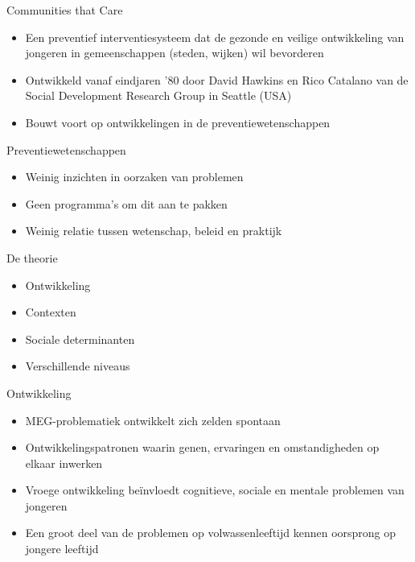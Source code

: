 \documentclass[
  ignorenonframetext,
]{beamer}
\providecommand{\tightlist}{%
  \setlength{\itemsep}{0pt}\setlength{\parskip}{0pt}}\usepackage{longtable,booktabs,array}
\begin{document}
\begin{frame}{Communities that Care}
\protect\hypertarget{communities-that-care}{}
\begin{itemize}
\tightlist
\item
  Een preventief interventiesysteem dat de gezonde en veilige
  ontwikkeling van jongeren in gemeenschappen (steden, wijken) wil
  bevorderen
\item
  Ontwikkeld vanaf eindjaren '80 door David Hawkins en Rico Catalano van
  de Social Development Research Group in Seattle (USA)
\item
  Bouwt voort op ontwikkelingen in de preventiewetenschappen
\end{itemize}
\end{frame}

\begin{frame}{Preventiewetenschappen}
\protect\hypertarget{preventiewetenschappen}{}
\begin{itemize}
\tightlist
\item
  Weinig inzichten in oorzaken van problemen
\item
  Geen programma's om dit aan te pakken
\item
  Weinig relatie tussen wetenschap, beleid en praktijk
\end{itemize}
\end{frame}

\begin{frame}{De theorie}
\protect\hypertarget{de-theorie}{}
\begin{itemize}
\tightlist
\item
  Ontwikkeling
\item
  Contexten
\item
  Sociale determinanten
\item
  Verschillende niveaus
\end{itemize}
\end{frame}

\begin{frame}{Ontwikkeling}
\protect\hypertarget{ontwikkeling}{}
\begin{itemize}
\tightlist
\item
  MEG-problematiek ontwikkelt zich zelden spontaan\\
\item
  Ontwikkelingspatronen waarin genen, ervaringen en omstandigheden op
  elkaar inwerken
\item
  Vroege ontwikkeling beïnvloedt cognitieve, sociale en mentale
  problemen van jongeren
\item
  Een groot deel van de problemen op volwassenleeftijd kennen oorsprong
  op jongere leeftijd
\end{itemize}
\end{frame}
\end{document}
